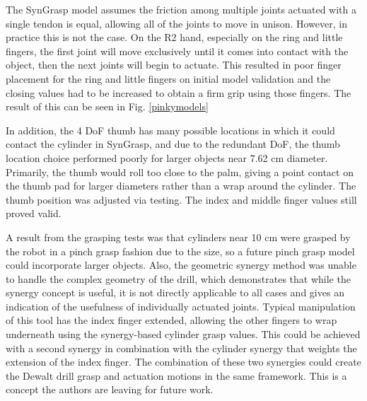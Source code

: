 \documentclass[runningheads,a4paper]{llncs}
\begin{document}
The SynGrasp model assumes the friction among multiple joints actuated with a single tendon is equal, allowing all of the joints to move in unison. However, in practice this is not the case. On the R2 hand, especially on the ring and little fingers, the first joint will move exclusively until it comes into contact with the object, then the next joints will begin to actuate. This resulted in poor finger placement for the ring and little fingers on initial model validation and the closing values had to be increased to obtain a firm grip using those fingers. The result of this can be seen in Fig. \ref{pinkymodels}

In addition, the 4 DoF thumb has many possible locations in which it could contact the cylinder in SynGrasp, and due to the redundant DoF, the thumb location choice performed poorly for larger objects near 7.62 cm diameter. Primarily, the thumb would roll too close to the palm, giving a point contact on the thumb pad for larger diameters rather than a wrap around the cylinder. The thumb position was adjusted via testing. The index and middle finger values still proved valid. 

A result from the grasping tests was that cylinders near 10 cm were grasped by the robot in a pinch grasp fashion due to the size, so a future pinch grasp model could incorporate larger objects. Also, the geometric synergy method was unable to handle the complex geometry of the drill, which demonstrates that while the synergy concept is useful, it is not directly applicable to all cases and gives an indication of the usefulness of individually actuated joints. Typical manipulation of this tool has the index finger extended, allowing the other fingers to wrap underneath using the synergy-based cylinder grasp values. This could be achieved with a second synergy in combination with the cylinder synergy that weights the extension of the index finger. The combination of these two synergies could create the Dewalt drill grasp and actuation motions in the same framework. This is a concept the authors are leaving for future work. 


\end{document}
